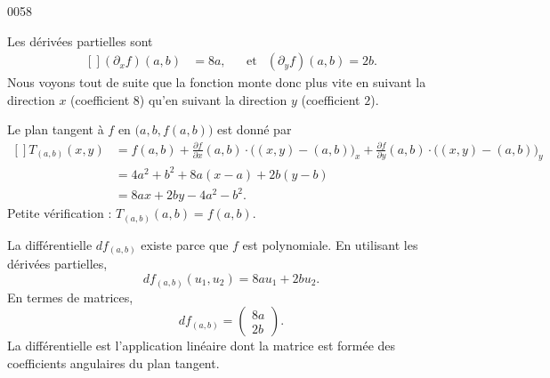 
\begin{corrige}{0058}

Les dérivées partielles sont
\begin{equation}
	\begin{aligned}[]
		(\partial_xf)(a,b)&=8a,&&\text{et}&(\partial_yf)(a,b)=2b.
	\end{aligned}
\end{equation}
Nous voyons tout de suite que la fonction monte donc plus vite en suivant la direction $x$ (coefficient $8$) qu'en suivant la direction $y$ (coefficient $2$).

Le plan tangent à $f$ en $\big( a,b,f(a,b) \big)$ est donné par 
\begin{equation}
	\begin{aligned}[]
		T_{(a,b)}(x,y)	&=f(a,b)+\frac{ \partial f }{ \partial x }(a,b)\cdot\big( (x,y)-(a,b) \big)_x+\frac{ \partial f }{ \partial y }(a,b)\cdot\big( (x,y)-(a,b) \big)_y\\
				&=4a^2+b^2+8a(x-a)+2b(y-b)\\
				&=8ax+2by-4a^2-b^2.
	\end{aligned}
\end{equation}
Petite vérification : $T_{(a,b)}(a,b)=f(a,b)$.

La différentielle $df_{(a,b)}$ existe parce que $f$ est polynomiale. En utilisant les dérivées partielles,
\begin{equation}
	df_{(a,b)}(u_1,u_2)=8au_1+2bu_2.
\end{equation}
En termes de matrices,
\begin{equation}
	df_{(a,b)}=\begin{pmatrix}
	8a	\\ 
	2b	
\end{pmatrix}.
\end{equation}
La différentielle est l'application linéaire dont la matrice est formée des \og coefficients angulaires\fg{} du plan tangent.


\end{corrige}

